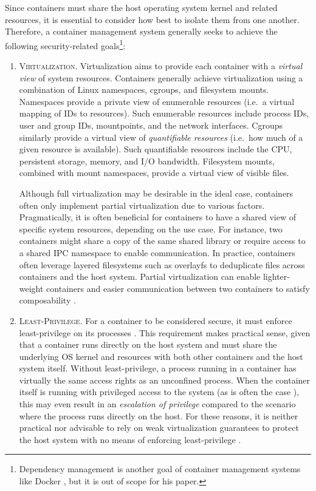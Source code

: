 Since containers must share the host operating system kernel and related resources, it is essential to consider how best to isolate them from one another. Therefore, a container management system generally seeks to achieve the following security-related goals\footnote{Dependency management is another goal of container management systems like Docker , but it is out of scope for his paper.}:
\begin{enumerate}[label=\bfseries CG\arabic*., ref=CG\arabic*, labelindent=1em]
  \item \textsc{Virtualization.}
    Virtualization aims to provide each container with a \textit{virtual view} of system resources. Containers generally achieve virtualization using a combination of Linux namespaces, cgroups, and filesystem mounts. Namespaces provide a private view of enumerable resources (i.e.~a virtual mapping of IDs to resources). Such enumerable resources include process IDs, user and group IDs, mountpoints, and the network interfaces. Cgroups similarly provide a virtual view of \textit{quantifiable resources} (i.e.~how much of a given resource is available). Such quantifiable resources include the CPU, persistent storage, memory, and I/O bandwidth. Filesystem mounts, combined with mount namespaces, provide a virtual view of visible files.

    Although full virtualization may be desirable in the ideal case, containers often only implement partial virtualization \cite{sultan2019_container_security,xin2018_container_security} due to various factors. Pragmatically, it is often beneficial for containers to have a shared view of specific system resources, depending on the use case. For instance, two containers might share a copy of the same shared library or require access to a shared IPC namespace to enable communication. In practice, containers often leverage layered filesystems such as overlayfs \cite{edge2010_overlayfs} to deduplicate files across containers and the host system. Partial virtualization can enable lighter-weight containers and easier communication between two containers to satisfy composability \cite{sultan2019_container_security}.

  \item \textsc{Least-Privilege.}
    For a container to be considered secure, it must enforce least-privilege on its processes \cite{sultan2019_container_security}. This requirement makes practical sense, given that a container runs directly on the host system and must share the underlying OS kernel and resources with both other containers and the host system itself. Without least-privilege, a process running in a container has virtually the same access rights as an unconfined process. When the container itself is running with privileged access to the system (as is often the case \cite{sultan2019_container_security,xin2018_container_security}), this may even result in an \textit{escalation of privilege} compared to the scenario where the process runs directly on the host. For these reasons, it is neither practical nor advisable to rely on weak virtualization guarantees to protect the host system with no means of enforcing least-privilege \cite{sultan2019_container_security}.


\end{enumerate}
